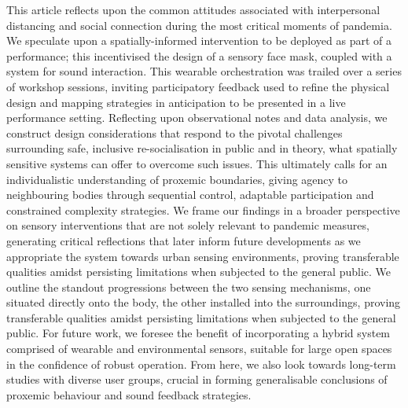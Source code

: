 This article reflects upon the common attitudes associated with interpersonal distancing and social connection during the most critical moments of pandemia. We speculate upon a spatially-informed intervention to be deployed as part of a performance; this incentivised the design of a sensory face mask, coupled with a system for sound interaction. This wearable orchestration was trailed over a series of workshop sessions, inviting participatory feedback used to refine the physical design and mapping strategies in anticipation to be presented in a live performance setting. Reflecting upon observational notes and data analysis, we construct design considerations that respond to the pivotal challenges surrounding safe, inclusive re-socialisation in public and in theory, what spatially sensitive systems can offer to overcome such issues. This ultimately calls for an individualistic understanding of proxemic boundaries, giving agency to neighbouring bodies through sequential control, adaptable participation and constrained complexity strategies. We frame our findings in a broader perspective on sensory interventions that are not solely relevant to pandemic measures, generating critical reflections that later inform future developments as we appropriate the system towards urban sensing environments, proving transferable qualities amidst persisting limitations when subjected to the general public. We outline the standout progressions between the two sensing mechanisms, one situated directly onto the body, the other installed into the surroundings, proving transferable qualities amidst persisting limitations when subjected to the general public. For future work, we foresee the benefit of incorporating a hybrid system comprised of wearable and environmental sensors, suitable for large open spaces in the confidence of robust operation. From here, we also look towards long-term studies with diverse user groups, crucial in forming generalisable conclusions of proxemic behaviour and sound feedback strategies.




